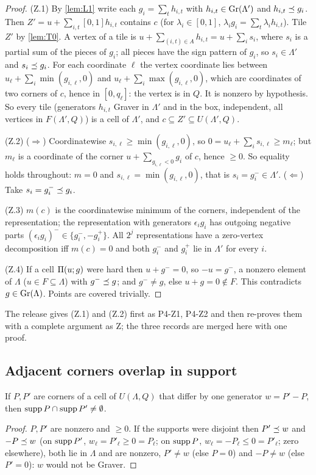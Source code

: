 \begin{proof}
(Z.1) By \cref{lem:L1} write each $g_i=\sum_th_{i,t}$ with $h_{i,t}\in\operatorname{Gr}(\Lambda')$ and $h_{i,t}\preceq g_i$. Then $Z'=u+\sum_{i,t}[0,1]h_{i,t}$ contains $c$ (for $\lambda_i\in[0,1]$, $\lambda_ig_i=\sum_t\lambda_ih_{i,t}$). Tile $Z'$ by \cref{lem:T0}. A vertex of a tile is $u+\sum_{(i,t)\in A}h_{i,t}=u+\sum_is_i$, where $s_i$ is a partial sum of the pieces of $g_i$; all pieces have the sign pattern of $g_i$, so $s_i\in\Lambda'$ and $s_i\preceq g_i$. For each coordinate $\ell$ the vertex coordinate lies between $u_\ell+\sum_i\min(g_{i,\ell},0)$ and $u_\ell+\sum_i\max(g_{i,\ell},0)$, which are coordinates of two corners of $c$, hence in $[0,q_\ell]$: the vertex is in $Q$. It is nonzero by hypothesis. So every tile (generators $h_{i,t}$ Graver in $\Lambda'$ and in the box, independent, all vertices in $F(\Lambda',Q)$) is a cell of $\Lambda'$, and $c\subseteq Z'\subseteq U(\Lambda',Q)$.

(Z.2) ($\Rightarrow$) Coordinatewise $s_{i,\ell}\ge\min(g_{i,\ell},0)$, so $0=u_\ell+\sum_is_{i,\ell}\ge m_\ell$; but $m_\ell$ is a coordinate of the corner $u+\sum_{g_{i,\ell}<0}g_i$ of $c$, hence $\ge0$. So equality holds throughout: $m=0$ and $s_{i,\ell}=\min(g_{i,\ell},0)$, that is $s_i=g_i^-\in\Lambda'$. ($\Leftarrow$) Take $s_i=g_i^-\preceq g_i$.

(Z.3) $m(c)$ is the coordinatewise minimum of the corners, independent of the representation; the representation with generators $\epsilon_ig_i$ has outgoing negative parts $(\epsilon_ig_i)^-\in\{g_i^-,-g_i^+\}$. All $2^j$ representations have a zero-vertex decomposition iff $m(c)=0$ and both $g_i^-$ and $g_i^+$ lie in $\Lambda'$ for every $i$.

(Z.4) If a cell $\Pi(u;g)$ were hard then $u+g^-=0$, so $-u=g^-$, a nonzero element of $\Lambda$ ($u\in F\subseteq\Lambda$) with $g^-\preceq g$; and $g^-\ne g$, else $u+g=0\notin F$. This contradicts $g\in\operatorname{Gr}(\Lambda)$. Points are covered trivially. \qedhere
\end{proof}
The release gives (Z.1) and (Z.2) first as P4-Z1, P4-Z2 and then re-proves them with a complete argument as Z; the three records are merged here with one proof.

\subsection{Adjacent corners overlap in support}\label{sec:lg}
\begin{lemma}\label{lem:LG}
If $P,P'$ are corners of a cell of $U(\Lambda,Q)$ that differ by one generator $w=P'-P$, then $\operatorname{supp} P\cap\operatorname{supp} P'\ne\emptyset$.
\end{lemma}
\begin{proof}
$P,P'$ are nonzero and $\ge0$. If the supports were disjoint then $P'\preceq w$ and $-P\preceq w$ (on $\operatorname{supp} P'$, $w_\ell=P'_\ell\ge0=P_\ell$; on $\operatorname{supp} P$, $w_\ell=-P_\ell\le0=P'_\ell$; zero elsewhere), both lie in $\Lambda$ and are nonzero, $P'\ne w$ (else $P=0$) and $-P\ne w$ (else $P'=0$): $w$ would not be Graver. \qedhere
\end{proof}

